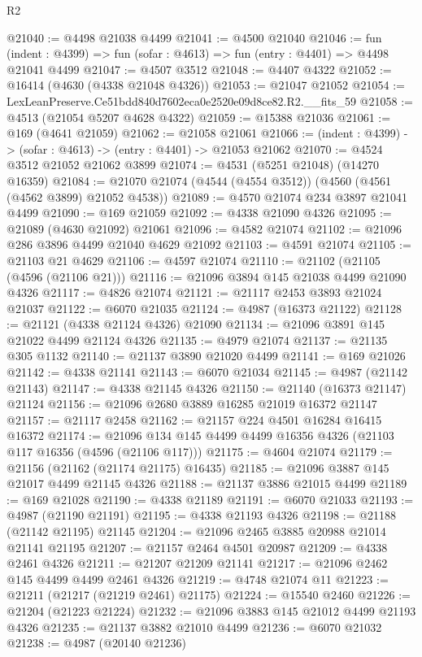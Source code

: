 \begin{lexlean}{R2}
\begin{coremodule}
@21040 := @4498 @21038 @4499
@21041 := @4500 @21040
@21046 := fun (indent : @4399) => fun (sofar : @4613) => fun (entry : @4401) => @4498 @21041 @4499
@21047 := @4507 @3512
@21048 := @4407 @4322
@21052 := @16414 (@4630 (@4338 @21048 @4326))
@21053 := @21047 @21052
@21054 := LexLeanPreserve.Ce51bdd840d7602eca0e2520e09d8ce82.R2.__fits_59
@21058 := @4513 (@21054 @5207 @4628 @4322)
@21059 := @15388 @21036
@21061 := @169 (@4641 @21059)
@21062 := @21058 @21061
@21066 := (indent : @4399) -> (sofar : @4613) -> (entry : @4401) -> @21053 @21062
@21070 := @4524 @3512 @21052 @21062 @3899
@21074 := @4531 (@5251 @21048) (@14270 @16359)
@21084 := @21070 @21074 (@4544 (@4554 @3512)) (@4560 (@4561 (@4562 @3899) @21052 @4538))
@21089 := @4570 @21074 @234 @3897 @21041 @4499
@21090 := @169 @21059
@21092 := @4338 @21090 @4326
@21095 := @21089 (@4630 @21092) @21061
@21096 := @4582 @21074
@21102 := @21096 @286 @3896 @4499 @21040 @4629 @21092
@21103 := @4591 @21074
@21105 := @21103 @21 @4629
@21106 := @4597 @21074
@21110 := @21102 (@21105 (@4596 (@21106 @21)))
@21116 := @21096 @3894 @145 @21038 @4499 @21090 @4326
@21117 := @4826 @21074
@21121 := @21117 @2453 @3893 @21024 @21037
@21122 := @6070 @21035
@21124 := @4987 (@16373 @21122)
@21128 := @21121 (@4338 @21124 @4326) @21090
@21134 := @21096 @3891 @145 @21022 @4499 @21124 @4326
@21135 := @4979 @21074
@21137 := @21135 @305 @1132
@21140 := @21137 @3890 @21020 @4499
@21141 := @169 @21026
@21142 := @4338 @21141
@21143 := @6070 @21034
@21145 := @4987 (@21142 @21143)
@21147 := @4338 @21145 @4326
@21150 := @21140 (@16373 @21147) @21124
@21156 := @21096 @2680 @3889 @16285 @21019 @16372 @21147
@21157 := @21117 @2458
@21162 := @21157 @224 @4501 @16284 @16415 @16372
@21174 := @21096 @134 @145 @4499 @4499 @16356 @4326 (@21103 @117 @16356 (@4596 (@21106 @117)))
@21175 := @4604 @21074
@21179 := @21156 (@21162 (@21174 @21175) @16435)
@21185 := @21096 @3887 @145 @21017 @4499 @21145 @4326
@21188 := @21137 @3886 @21015 @4499
@21189 := @169 @21028
@21190 := @4338 @21189
@21191 := @6070 @21033
@21193 := @4987 (@21190 @21191)
@21195 := @4338 @21193 @4326
@21198 := @21188 (@21142 @21195) @21145
@21204 := @21096 @2465 @3885 @20988 @21014 @21141 @21195
@21207 := @21157 @2464 @4501 @20987
@21209 := @4338 @2461 @4326
@21211 := @21207 @21209 @21141
@21217 := @21096 @2462 @145 @4499 @4499 @2461 @4326
@21219 := @4748 @21074 @11
@21223 := @21211 (@21217 (@21219 @2461) @21175)
@21224 := @15540 @2460
@21226 := @21204 (@21223 @21224)
@21232 := @21096 @3883 @145 @21012 @4499 @21193 @4326
@21235 := @21137 @3882 @21010 @4499
@21236 := @6070 @21032
@21238 := @4987 (@20140 @21236)

\end{coremodule}
\end{lexlean}
